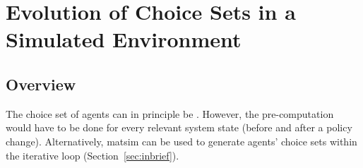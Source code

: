 \section{Evolution of Choice Sets in a Simulated
Environment}
\label{sec:Evolution-of-choice}

\subsection{Overview}

The choice set of agents can in principle be .
However, the pre-computation would have to be done for every relevant system
state (\eg before and after a policy change). Alternatively, \acrshort{matsim} can be used
to generate agents' choice sets within the iterative loop
(Section~\ref{sec:inbrief}).

